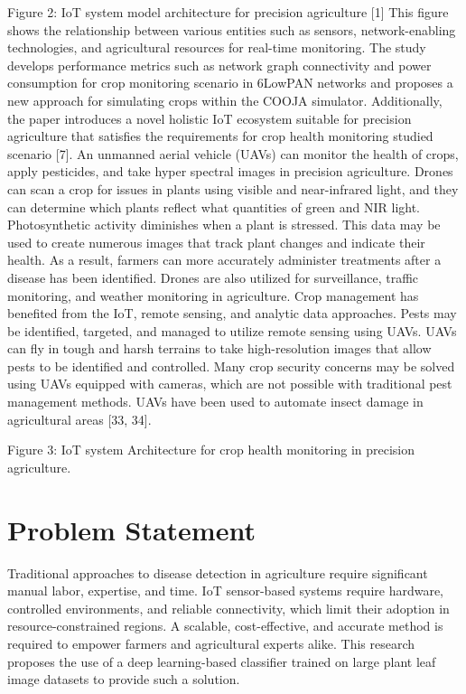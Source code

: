 \documentclass[12pt,a4paper]{report}
\begin{document}
\begin{List of Abbreviations}
 Figure 2: IoT system model architecture for precision agriculture [1]
 This figure shows the relationship between various entities such as sensors, network-enabling technologies, and agricultural resources for real-time monitoring.
The study develops performance metrics such as network graph connectivity and power consumption for crop monitoring scenario in 6LowPAN networks and proposes a new approach for simulating crops within the COOJA simulator. Additionally, the paper introduces a novel holistic IoT ecosystem suitable for precision agriculture that satisfies the requirements for crop health monitoring studied scenario [7]. 
An unmanned aerial vehicle (UAVs) can monitor the health of crops, apply pesticides, and take hyper spectral images in precision agriculture. Drones can scan a crop for issues in plants using visible and near-infrared light, and they can determine which plants reflect what quantities of green and NIR light. Photosynthetic activity diminishes when a plant is stressed. This data may be used to create numerous images that track plant changes and indicate their health. As a result, farmers can more accurately administer treatments after a disease has been identified. Drones are also utilized for surveillance, traffic monitoring, and weather monitoring in agriculture. Crop management has benefited from the IoT, remote sensing, and analytic data approaches. Pests may be identified, targeted, and managed to utilize remote sensing using UAVs. UAVs can fly in tough and harsh terrains to take high-resolution images that allow pests to be identified and controlled. Many crop security concerns may be solved using UAVs equipped with cameras, which are not possible with traditional pest management methods. UAVs have been used to automate insect damage in agricultural areas [33, 34].

Figure 3: IoT system Architecture for crop health monitoring in precision agriculture.

\section{Problem Statement}
Traditional approaches to disease detection in agriculture require significant manual labor, expertise, and time. IoT sensor-based systems require hardware, controlled environments, and reliable connectivity, which limit their adoption in resource-constrained regions. A scalable, cost-effective, and accurate method is required to empower farmers and agricultural experts alike. This research proposes the use of a deep learning-based classifier trained on large plant leaf image datasets to provide such a solution.


\end{List of Abbreviations}
\end{document}
